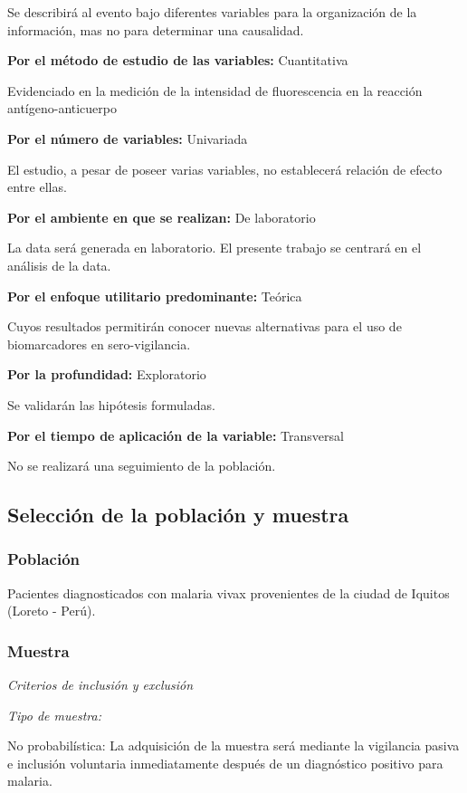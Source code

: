 \documentclass[]{article}
\begin{document}
Se describirá al evento bajo diferentes variables para la organización
de la información, mas no para determinar una causalidad.

\textbf{Por el método de estudio de las variables:} Cuantitativa

Evidenciado en la medición de la intensidad de fluorescencia en la
reacción antígeno-anticuerpo

\textbf{Por el número de variables:} Univariada

El estudio, a pesar de poseer varias variables, no establecerá relación
de efecto entre ellas.

\textbf{Por el ambiente en que se realizan:} De laboratorio

La data será generada en laboratorio. El presente trabajo se centrará en
el análisis de la data.

\textbf{Por el enfoque utilitario predominante:} Teórica

Cuyos resultados permitirán conocer nuevas alternativas para el uso de
biomarcadores en sero-vigilancia.

\textbf{Por la profundidad:} Exploratorio

Se validarán las hipótesis formuladas.

\textbf{Por el tiempo de aplicación de la variable:} Transversal

No se realizará una seguimiento de la población.

\subsection{Selección de la población y
muestra}\label{seleccion-de-la-poblacion-y-muestra}

\subsubsection{Población}\label{poblacion}

Pacientes diagnosticados con malaria vivax provenientes de la ciudad de
Iquitos (Loreto - Perú).

\subsubsection{Muestra}\label{muestra}

\emph{Criterios de inclusión y exclusión}

\emph{Tipo de muestra:}

No probabilística: La adquisición de la muestra será mediante la
vigilancia pasiva e inclusión voluntaria inmediatamente después de un
diagnóstico positivo para malaria.
\end{document}
